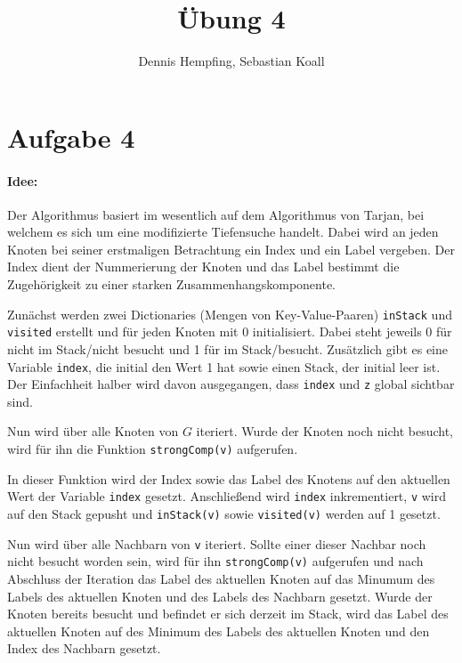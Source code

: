 \documentclass[12pt]{scrartcl}%
\theoremstyle{nonumberplain}
\newcommand{\code}[1]{\lstinline[basicstyle=\ttfamily\color{black}]{#1}}
\begin{document}
\author{Dennis Hempfing, Sebastian Koall}
\title{Übung 4}
\date{} 
\pagestyle{myheadings}

\maketitle %
 
\section*{Aufgabe 4}

\paragraph{Idee:} Der Algorithmus basiert im wesentlich auf dem Algorithmus von Tarjan, bei welchem es sich um eine modifizierte Tiefensuche handelt. Dabei wird an jeden Knoten bei seiner erstmaligen Betrachtung ein Index und ein Label vergeben. Der Index dient der Nummerierung der Knoten und das Label bestimmt die Zugehörigkeit zu einer starken Zusammenhangskomponente.

Zunächst werden zwei Dictionaries (Mengen von Key-Value-Paaren) \code{inStack} und \code{visited} erstellt und für jeden Knoten mit 0 initialisiert. Dabei steht jeweils 0 für nicht im Stack/nicht besucht und 1 für im Stack/besucht. Zusätzlich gibt es eine Variable \code{index}, die initial den Wert 1 hat sowie einen Stack, der initial leer ist. Der Einfachheit halber wird davon ausgegangen, dass \code{index} und \code{z} global sichtbar sind.

Nun wird über alle Knoten von $G$ iteriert. Wurde der Knoten noch nicht besucht, wird für ihn die Funktion \code{strongComp(v)} aufgerufen.

In dieser Funktion wird der Index sowie das Label des Knotens auf den aktuellen Wert der Variable \code{index} gesetzt. Anschließend wird \code{index} inkrementiert, \code{v} wird auf den Stack gepusht und \code{inStack(v)} sowie \code{visited(v)} werden auf 1 gesetzt.

Nun wird über alle Nachbarn von \code{v} iteriert. Sollte einer dieser Nachbar noch nicht besucht worden sein, wird für ihn \code{strongComp(v)} aufgerufen und nach Abschluss der Iteration das Label des aktuellen Knoten auf das Minumum des Labels des aktuellen Knoten und des Labels des Nachbarn gesetzt. Wurde der Knoten bereits besucht und befindet er sich derzeit im Stack, wird das Label des aktuellen Knoten auf des Minimum des Labels des aktuellen Knoten und den Index des Nachbarn gesetzt. 
\end{document}
